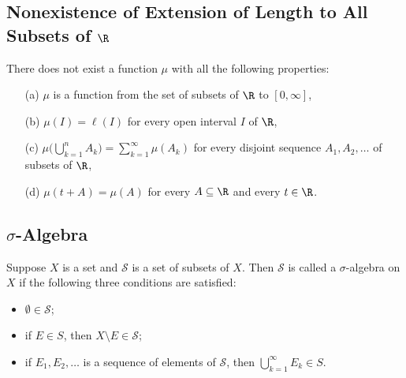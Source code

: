 \subsection{Nonexistence of Extension of Length to All Subsets of \( \R  \)}

\begin{prop}
    There does not exist a function \( \mu  \) with all the following properties:
    \begin{enumerate}
        \item[(a)] \( \mu \) is a function from the set of subsets of \( \R  \) to \( [0,\infty ] \),
        \item[(b)] \( \mu(I) = \ell(I) \) for every open interval \( I  \) of \( \R  \),
        \item[(c)] \( \mu \Big(  \displaystyle \bigcup_{ k=1  }^{ n }  {A}_{k} \Big) = \sum_{ k=1  }^{ \infty  } \mu({A}_{k}) \) for every disjoint sequence \( {A}_{1}, {A}_{2}, \dots  \) of subsets of \( \R  \),
        \item[(d)] \( \mu(t + A ) = \mu(A) \) for every \( A \subseteq  \R  \) and every \( t \in \R  \).
    \end{enumerate}
\end{prop}

\subsection{\( \sigma \)-Algebra}

\begin{definition}
    Suppose \( X  \) is a set and \( \mathcal{S} \) is a set of subsets of \( X  \). Then \( \mathcal{S} \) is called a \( \sigma \)-algebra on \( X  \) if the following three conditions are satisfied: 
    \begin{itemize}
        \item \( \emptyset \in \mathcal{S} \);
        \item if \( E \in S  \), then \( X \setminus  E \in \mathcal{S} \);
        \item if \( {E}_{1}, {E}_{2}, \dots  \) is a sequence of elements of \( \mathcal{S} \), then \( \bigcup_{ k = 1  }^{ \infty  }  {E}_{k} \in S  \).
    \end{itemize}
\end{definition}

